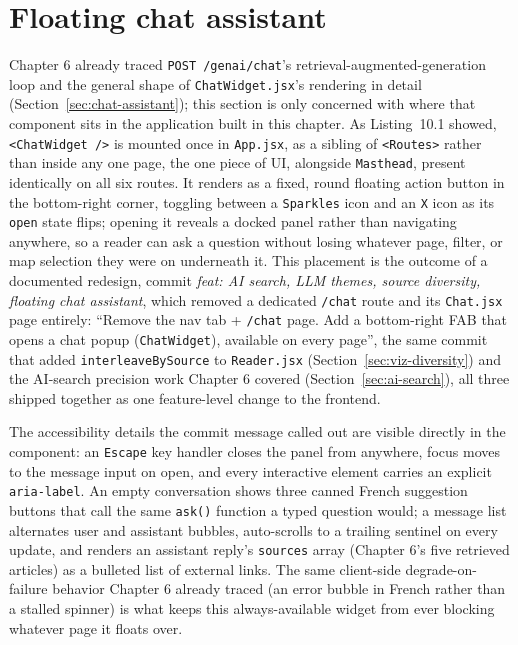 \section{Floating chat assistant}
\label{sec:frontend-chat}
\begin{sloppypar}
Chapter 6 already traced \texttt{POST /genai/chat}'s retrieval-augmented-generation loop and the general shape of \texttt{ChatWidget.jsx}'s rendering in detail (Section~\ref{sec:chat-assistant}); this section is only concerned with where that component sits in the application built in this chapter. As Listing~10.1 showed, \texttt{<ChatWidget />} is mounted once in \texttt{App.jsx}, as a sibling of \texttt{<Routes>} rather than inside any one page, the one piece of UI, alongside \texttt{Masthead}, present identically on all six routes. It renders as a fixed, round floating action button in the bottom-right corner, toggling between a \texttt{Sparkles} icon and an \texttt{X} icon as its \texttt{open} state flips; opening it reveals a docked panel rather than navigating anywhere, so a reader can ask a question without losing whatever page, filter, or map selection they were on underneath it. This placement is the outcome of a documented redesign, commit \textit{feat: AI search, LLM themes, source diversity, floating chat assistant}, which removed a dedicated \texttt{/chat} route and its \texttt{Chat.jsx} page entirely: ``Remove the nav tab + \texttt{/chat} page. Add a bottom-right FAB that opens a chat popup (\texttt{ChatWidget}), available on every page'', the same commit that added \texttt{interleaveBySource} to \texttt{Reader.jsx} (Section~\ref{sec:viz-diversity}) and the AI-search precision work Chapter 6 covered (Section~\ref{sec:ai-search}), all three shipped together as one feature-level change to the frontend.
\end{sloppypar}

\begin{sloppypar}
The accessibility details the commit message called out are visible directly in the component: an \texttt{Escape} key handler closes the panel from anywhere, focus moves to the message input on open, and every interactive element carries an explicit \texttt{aria-label}. An empty conversation shows three canned French suggestion buttons that call the same \texttt{ask()} function a typed question would; a message list alternates user and assistant bubbles, auto-scrolls to a trailing sentinel on every update, and renders an assistant reply's \texttt{sources} array (Chapter 6's five retrieved articles) as a bulleted list of external links. The same client-side degrade-on-failure behavior Chapter 6 already traced (an error bubble in French rather than a stalled spinner) is what keeps this always-available widget from ever blocking whatever page it floats over.
\end{sloppypar}

